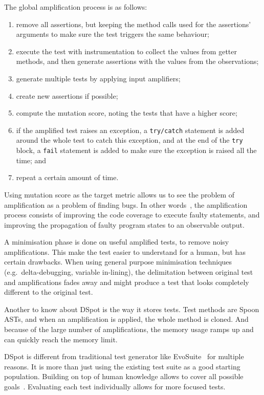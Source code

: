 \documentclass[a4paper,11pt]{sdm_internship}
\newcommand{\dspot}{DSpot\xspace}
\theoremstyle{definition}
\begin{document}
The global amplification process is as follows:
\begin{enumerate}
  \item remove all assertions, but keeping the method calls used for the assertions' arguments to make sure the test triggers the same behaviour;
  \item execute the test with instrumentation to collect the values from getter methods, and then generate assertions with the values from the observations;
  \item generate multiple tests by applying input amplifiers;
  \item create new assertions if possible;
  \item compute the mutation score, noting the tests that have a higher score;
  \item if the amplified test raises an exception, a \texttt{try/catch} statement is added around the whole test to catch this exception, and at the end of the \texttt{try} block, a \texttt{fail} statement is added to make sure the exception is raised all the time; and
  \item repeat a certain amount of time.
\end{enumerate}

Using mutation score as the target metric allows us to see the problem of amplification as a problem of finding bugs.
In other words~\cite{shamshiri2015automatically}, the amplification process consists of improving the code coverage to execute faulty statements, and improving the propagation of faulty program states to an observable output.

A minimisation phase is done on useful amplified tests, to remove noisy amplifications.
This make the test easier to understand for a human, but has certain drawbacks.
When using general purpose minimisation techniques (e.g.\ delta-debugging, variable in-lining), the delimitation between original test and amplifications fades away and might produce a test that looks completely different to the original test.

Another to know about \dspot{} is the way it stores tests.
Test methods are Spoon ASTs, and when an amplification is applied, the whole method is cloned.
And because of the large number of amplifications, the memory usage ramps up and can quickly reach the memory limit.

\dspot{} is different from traditional test generator like EvoSuite~\cite{fraser2011evosuite} for multiple reasons.
It is more than just using the existing test suite as a good starting population.
Building on top of human knowledge allows to cover all possible goals~\cite{rojas2017detailed}.
Evaluating each test individually allows for more focused tests.
\end{document}
